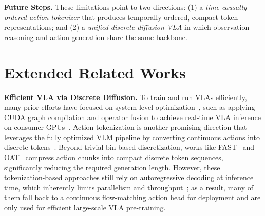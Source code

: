 \documentclass{article}
\begin{document}
\textbf{Future Steps.}
These limitations point to two directions: (1) a \emph{time-causally ordered action tokenizer} that produces temporally ordered, compact token representations; and (2) a \emph{unified discrete diffusion VLA} in which observation reasoning and action generation share the same backbone.


\clearpage





\newpage
\appendix
\section{Extended Related Works}
\label{app:related}

\textbf{Efficient VLA via Discrete Diffusion.}
To train and run VLAs efficiently, many prior efforts have focused on system-level optimization~\citep{kim2024openvla}, such as applying CUDA graph compilation and operator fusion to achieve real-time VLA inference on consumer GPUs~\citep{ma2025running}.
Action tokenization is another promising direction that leverages the fully optimized VLM pipeline by converting continuous actions into discrete tokens~\citep{intelligence2025pi_}.
Beyond trivial bin-based discretization, works like FAST~\citep{pertsch2025fast} and OAT~\citep{liu2026oat} compress action chunks into compact discrete token sequences, significantly reducing the required generation length.
However, these tokenization-based approaches still rely on autoregressive decoding at inference time, which inherently limits parallelism and throughput~\citep{intelligence2025pi_}; as a result, many of them fall back to a continuous flow-matching action head for deployment and are only used for efficient large-scale VLA pre-training.
\end{document}
